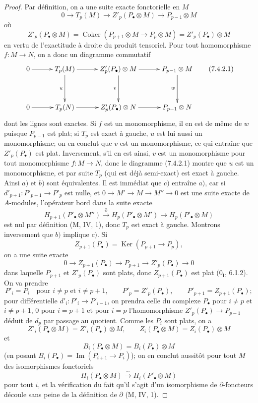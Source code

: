\begin{proof}
Par définition, on a une suite exacte fonctorielle en $M$
\[
  0\longrightarrow T_p(M)
  \longrightarrow Z'_p(P_\bullet\otimes M)
  \longrightarrow P_{p-1}\otimes M
\]
où
\[
  Z'_p(P_\bullet\otimes M)
  =
  \operatorname{Coker}(P_{p+1}\otimes M\longrightarrow P_p\otimes M)
  =
  Z'_p(P_\bullet)\otimes M
\]
en vertu de l'exactitude à droite du produit tensoriel. Pour tout homomorphisme
$f:M\to N$, on a donc un diagramme commutatif
\[
\xymatrix@C=30pt@R=38pt{
  0\ar[r]
  &T_p(M)\ar[r]\ar[d]_u
  &Z'_p(P_\bullet)\otimes M\ar[r]\ar[d]_v
  &P_{p-1}\otimes M\ar[d]_w
  \\
  0\ar[r]
  &T_p(N)\ar[r]
  &Z'_p(P_\bullet)\otimes N\ar[r]
  &P_{p-1}\otimes N
}
\tag{7.4.2.1}\label{III.7.4.2.1.fr}
\]
dont les lignes sont exactes. Si $f$ est un monomorphisme, il en est de même
de $w$ puisque $P_{p-1}$ est plat; si $T_p$ est exact à gauche, $u$ est lui
aussi un monomorphisme; on en conclut que $v$ est un monomorphisme, ce qui
entraîne que $Z'_p(P_\bullet)$ est plat. Inversement, s'il en est ainsi, $v$
est un monomorphisme pour tout monomorphisme $f:M\to N$, donc le diagramme
(7.4.2.1) montre que $u$ est un monomorphisme, et par suite $T_p$ (qui est déjà
semi-exact) est exact à gauche. Ainsi $a)$ et $b)$ sont équivalentes. Il est
immédiat que $c)$ entraîne $a)$, car si
$d'_{p+1}:P'_{p+1}\to P'_p$ est nulle, et
$0\to M'\to M\to M''\to0$ est une suite exacte de $A$-modules, l'opérateur
bord dans la suite exacte
\[
  H_{p+1}(P'_\bullet\otimes M'')
  \xrightarrow{\partial}H_p(P'_\bullet\otimes M')
  \longrightarrow H_p(P'_\bullet\otimes M)
\]
est nul par définition (M, IV, 1), donc $T_p$ est exact à gauche. Montrons
inversement que $b)$ implique $c)$. Si
\[
  Z_{p+1}(P_\bullet)=\operatorname{Ker}(P_{p+1}\longrightarrow P_p),
\]
on a une suite exacte
\[
  0\longrightarrow Z_{p+1}(P_\bullet)\longrightarrow P_{p+1}
  \longrightarrow Z'_p(P_\bullet)\longrightarrow0
\]
dans laquelle $P_{p+1}$ et $Z'_p(P_\bullet)$ sont plats, donc
$Z_{p+1}(P_\bullet)$ est plat ($0_{\mathrm I}$, 6.1.2). On va prendre
\[
  P'_i=P_i\quad\text{pour }i\ne p\text{ et }i\ne p+1,
  \qquad
  P'_p=Z'_p(P_\bullet),
  \qquad
  P'_{p+1}=Z_{p+1}(P_\bullet);
\]
pour différentielle $d'_i:P'_i\to P'_{i-1}$, on prendra celle du complexe
$P_\bullet$ pour $i\ne p$ et $i\ne p+1$, $0$ pour $i=p+1$ et pour $i=p$
l'homomorphisme $Z'_p(P_\bullet)\to P_{p-1}$ déduit de $d_p$ par passage au
quotient. Comme les $P_i$ sont plats, on a
\[
  Z'_i(P_\bullet\otimes M)=Z'_i(P_\bullet)\otimes M,
  \qquad
  Z_i(P_\bullet\otimes M)=Z_i(P_\bullet)\otimes M
\]
et
\[
  B_i(P_\bullet\otimes M)=B_i(P_\bullet)\otimes M
\]
(en posant $B_i(P_\bullet)=\operatorname{Im}(P_{i+1}\to P_i)$); on en conclut
aussitôt pour tout $M$ des isomorphismes fonctoriels
\[
  H_i(P_\bullet\otimes M)\xrightarrow{\sim}H_i(P'_\bullet\otimes M)
\]
pour tout $i$, et la vérification du fait qu'il s'agit d'un isomorphisme de
$\partial$-foncteurs découle sans peine de la définition de $\partial$
(M, IV, 1).
\end{proof}

